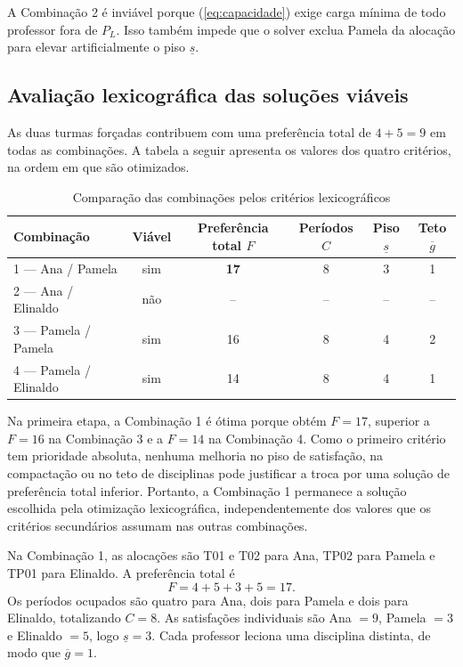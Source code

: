 \documentclass[11pt,a4paper]{article}
\begin{document}
A Combinação 2 é inviável porque (\ref{eq:capacidade}) exige carga mínima de todo professor fora de $P_L$. Isso também impede que o solver exclua Pamela da alocação para elevar artificialmente o piso $\underline{s}$.

\subsection{Avaliação lexicográfica das soluções viáveis}

As duas turmas forçadas contribuem com uma preferência total de $4+5=9$ em todas as combinações. A tabela a seguir apresenta os valores dos quatro critérios, na ordem em que são otimizados.

\begin{table}[htbp]
\centering
\caption{Comparação das combinações pelos critérios lexicográficos}
\label{tab:resumo_final}
\small
\begin{tabular}{lccccc}
\toprule
Combinação & Viável & Preferência total $F$ & Períodos $C$ & Piso $\underline{s}$ & Teto $\overline{g}$\\
\midrule
1 --- Ana / Pamela      & sim & \textbf{17} & 8 & 3 & 1 \\
2 --- Ana / Elinaldo    & não & -- & -- & -- & -- \\
3 --- Pamela / Pamela   & sim & 16 & 8 & 4 & 2 \\
4 --- Pamela / Elinaldo & sim & 14 & 8 & 4 & 1 \\
\bottomrule
\end{tabular}
\end{table}

Na primeira etapa, a Combinação 1 é ótima porque obtém $F=17$, superior a $F=16$ na Combinação 3 e a $F=14$ na Combinação 4. Como o primeiro critério tem prioridade absoluta, nenhuma melhoria no piso de satisfação, na compactação ou no teto de disciplinas pode justificar a troca por uma solução de preferência total inferior. Portanto, a Combinação 1 permanece a solução escolhida pela otimização lexicográfica, independentemente dos valores que os critérios secundários assumam nas outras combinações.

Na Combinação 1, as alocações são T01 e T02 para Ana, TP02 para Pamela e TP01 para Elinaldo. A preferência total é
\[
F=4+5+3+5=17.
\]
Os períodos ocupados são quatro para Ana, dois para Pamela e dois para Elinaldo, totalizando $C=8$. As satisfações individuais são Ana $=9$, Pamela $=3$ e Elinaldo $=5$, logo $\underline{s}=3$. Cada professor leciona uma disciplina distinta, de modo que $\overline{g}=1$.
\end{document}

